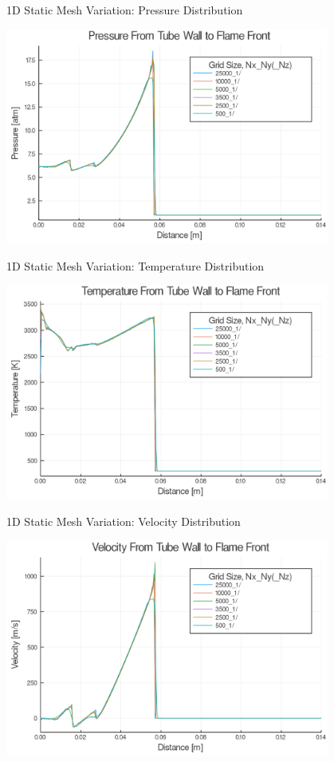 \begin{frame}{1D Static Mesh Variation: Pressure Distribution}
\begin{center}
\includegraphics[width=0.8\textwidth]{../figs/static1d/p.png}
\end{center}
\end{frame}

\begin{frame}{1D Static Mesh Variation: Temperature Distribution}
\begin{center}
\includegraphics[width=0.8\textwidth]{../figs/static1d/t.png}
\end{center}
\end{frame}

\begin{frame}{1D Static Mesh Variation: Velocity Distribution}
\begin{center}
\includegraphics[width=0.8\textwidth]{../figs/static1d/u.png}
\end{center}
\end{frame}

